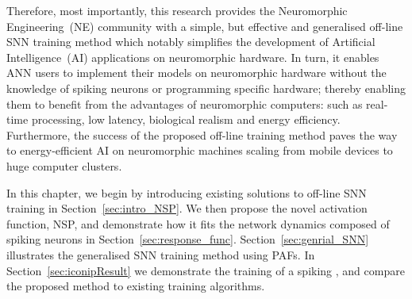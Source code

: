Therefore, most importantly, this research provides the Neuromorphic Engineering~(NE) community with a simple, but effective and generalised off-line SNN training method which notably simplifies the development of Artificial Intelligence~(AI) applications on neuromorphic hardware.
In turn, it enables ANN users to implement their models on neuromorphic hardware without the knowledge of spiking neurons or programming specific hardware;
thereby enabling them to benefit from the advantages of neuromorphic computers: such as real-time processing, low latency, biological realism and energy efficiency.
Furthermore, the success of the proposed off-line training method paves the way to energy-efficient AI on neuromorphic machines scaling from mobile devices to huge computer clusters.



In this chapter, we begin by introducing existing solutions to off-line SNN training in Section~\ref{sec:intro_NSP}.
We then propose the novel activation function, NSP, and demonstrate how it fits the network dynamics composed of spiking neurons in Section~\ref{sec:response_func}.
Section~\ref{sec:genrial_SNN} illustrates the generalised SNN training method using PAFs.
In Section~\ref{sec:iconipResult} we demonstrate the training of a spiking \DIFdelbegin {}\DIFdelend \DIFaddbegin {}\DIFaddend , and compare the proposed method to existing training algorithms.

\section{\DIFdelbegin {}\DIFdelend \DIFaddbegin {}\DIFaddend }
\DIFdelbegin %
\DIFdelend \DIFaddbegin \label{sec:NSP_relate}
\DIFaddend 

